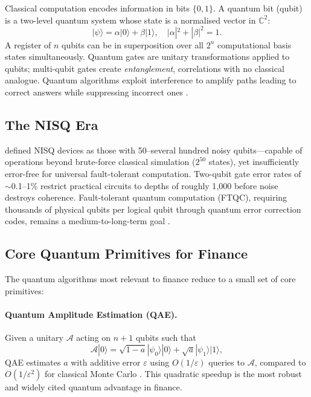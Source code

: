 \documentclass[12pt,a4paper]{article}
\begin{document}
Classical computation encodes information in bits $\{0,1\}$. A quantum bit (qubit) is a two-level quantum system whose state is a normalised vector in $\mathbb{C}^2$:
\[
|\psi\rangle = \alpha|0\rangle + \beta|1\rangle, \quad |\alpha|^2 + |\beta|^2 = 1.
\]
A register of $n$ qubits can be in superposition over all $2^n$ computational basis states simultaneously. Quantum gates are unitary transformations applied to qubits; multi-qubit gates create \emph{entanglement}, correlations with no classical analogue. Quantum algorithms exploit interference to amplify paths leading to correct answers while suppressing incorrect ones \citep{egger_quantum_2020, preskill_quantum_2018}.

\subsection{The NISQ Era}

\citet{preskill_quantum_2018} defined NISQ devices as those with 50--several hundred noisy qubits---capable of operations beyond brute-force classical simulation ($2^{50}$ states), yet insufficiently error-free for universal fault-tolerant computation. Two-qubit gate error rates of $\sim$0.1--1\% restrict practical circuits to depths of roughly 1{,}000 before noise destroys coherence. Fault-tolerant quantum computation (FTQC), requiring thousands of physical qubits per logical qubit through quantum error correction codes, remains a medium-to-long-term goal \citep{blanchet_connecting_2025}.

\subsection{Core Quantum Primitives for Finance}

The quantum algorithms most relevant to finance reduce to a small set of core primitives:

\paragraph{Quantum Amplitude Estimation (QAE).}
Given a unitary $\mathcal{A}$ acting on $n+1$ qubits such that
\[
\mathcal{A}|0\rangle = \sqrt{1-a}|\psi_0\rangle|0\rangle + \sqrt{a}|\psi_1\rangle|1\rangle,
\]
QAE estimates $a$ with additive error $\varepsilon$ using $O(1/\varepsilon)$ queries to $\mathcal{A}$, compared to $O(1/\varepsilon^2)$ for classical Monte Carlo \citep{stamatopoulos_option_2020, matsakos_quantum_2024}. This quadratic speedup is the most robust and widely cited quantum advantage in finance.
\end{document}
